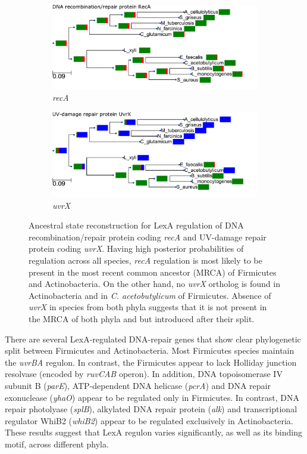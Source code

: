 \documentclass[12pt]{article}
\begin{document}
\begin{figure}
  \centering
  \begin{subfigure}{0.49\textwidth}
    \includegraphics[width=\textwidth]{figures/chapter4/recA_ASR}
    \caption{\textit{recA}}
    \label{fig:ASR-a}
  \end{subfigure}
  \begin{subfigure}{0.49\textwidth}
    \includegraphics[width=\textwidth]{figures/chapter4/uvrX_ASR}
    \caption{\textit{uvrX}}
    \label{fig:ASR-b}
  \end{subfigure}
  \caption{Ancestral state reconstruction for LexA regulation of DNA
    recombination/repair protein coding \textit{recA} and UV-damage repair
    protein coding \textit{uvrX}. Having high posterior probabilities of
    regulation across all species, \textit{recA} regulation is most likely to
    be present in the most recent common ancestor (MRCA) of Firmicutes and
    Actinobacteria. On the other hand, no \textit{uvrX} ortholog is found in
    Actinobacteria and in \textit{C. acetobutylicum} of Firmicutes. Absence of
    \textit{uvrX} in species from both phyla suggests that it is not present in
    the MRCA of both phyla and but introduced after their split.}
  \label{fig:ASR}
 \end{figure}


 There are several LexA-regulated DNA-repair genes that show clear phylogenetic
 split between Firmicutes and Actinobacteria. Most Firmicutes species maintain
 the \textit{uvrBA} regulon. In contrast, the Firmicutes appear to lack
 Holliday junction resolvase (encoded by \textit{ruvCAB} operon). In addition,
 DNA topoisomerase IV subunit B (\textit{parE}), ATP-dependent DNA helicase
 (\textit{pcrA}) and DNA repair exonuclease (\textit{yhaO}) appear to be
 regulated only in Firmicutes. In contrast, DNA repair photolyase
 (\textit{splB}), alkylated DNA repair protein (\textit{alk}) and
 transcriptional regulator WhiB2 (\textit{whiB2}) appear to be regulated
 exclusively in Actinobacteria. These results suggest that LexA regulon varies
 significantly, as well as its binding motif, across different phyla.
\end{document}
